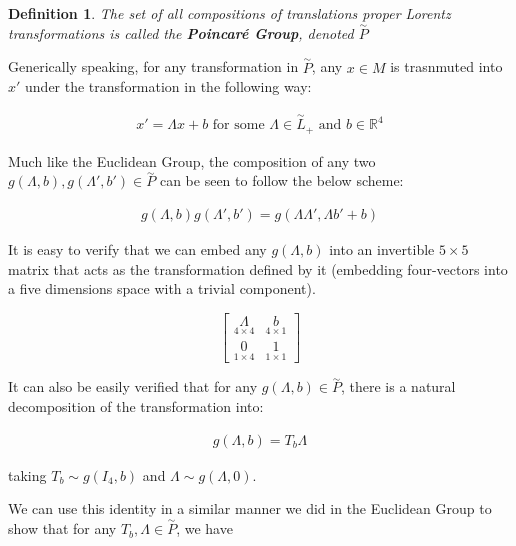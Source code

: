 \documentclass[10pt]{ucthesis}
\newcommand{\R}{\mathbb{R}}
\newtheorem{definition}{Definition}[chapter]
\begin{document}
\begin{definition}
	The set of all compositions of translations proper Lorentz transformations is called the \textbf{Poincar\'e Group}, denoted $\overset{\sim}{P}$
\end{definition}

Generically speaking, for any transformation in $\overset{\sim}{P}$, any $x\in M$ is trasnmuted into $x'$ under the transformation in the following way:

\begin{equation}
\begin{aligned}
	x' = \Lambda x + b \text{ for some }\Lambda\in\overset{\sim}{L}_+ \text{ and } b\in\R^4
\end{aligned}
\end{equation}

Much like the Euclidean Group, the composition of any two $g(\Lambda,b),g(\Lambda',b')\in\overset{\sim}{P} $  can be seen to follow the below scheme:

\begin{equation}
\begin{aligned}
g(\Lambda,b)g(\Lambda',b') = g(\Lambda\Lambda', \Lambda b' + b)
\end{aligned}
\end{equation}

It is easy to verify that we can embed any $g(\Lambda,b)$ into an invertible $5\times 5$ matrix that acts as the transformation defined by it (embedding four-vectors into a five dimensions space with a trivial component).

$$\begin{bmatrix}
	\underset{4\times 4}{\Lambda} & \underset{4\times 1}{b}\\
	\underset{1\times 4}{0} & \underset{1\times 1}{1}
\end{bmatrix}$$

It can also be easily verified that for any $g(\Lambda,b)\in\overset{\sim}{P}$, there is a natural decomposition of the transformation into:

\begin{equation}
\begin{aligned}
g(\Lambda,b)=T_b\Lambda
 \end{aligned}
\end{equation}


taking $T_b \sim g(I_4,b)$ and $\Lambda \sim g(\Lambda,0)$.

We can use this identity in a similar manner we did in the Euclidean Group to show that for any $T_b,\Lambda\in\overset{\sim}{P}$, we have
\end{document}
